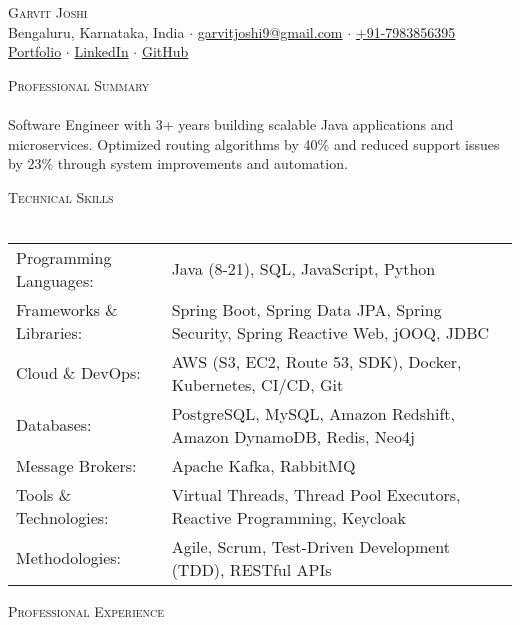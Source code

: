 \documentclass[a4paper]{article}
\newcommand{\lineunder} {
    \vspace*{-8pt} \\
    \hspace*{-18pt} \hrulefill \\
}
\newcommand{\header} [1] {
    {\hspace*{-18pt}\vspace*{6pt} \textsc{#1}}
    \vspace*{-6pt} \lineunder
}
\begin{document}
\vspace*{-30pt}

    

\vspace*{-10pt}
\begin{center}
	{\Huge \scshape {Garvit Joshi}}\\
	Bengaluru, Karnataka, India $\cdot$ \href{mailto:garvitjoshi9@gmail.com}{garvitjoshi9@gmail.com} $\cdot$ \href{tel:+917983856395}{+91-7983856395}\\
	\href{https://garvit-joshi.github.io}{Portfolio} $\cdot$ \href{https://www.linkedin.com/in/garvitjoshi9/}{LinkedIn} $\cdot$ \href{https://github.com/garvit-joshi/}{GitHub}\\
\end{center}

\header{Professional Summary}
Software Engineer with 3+ years building scalable Java applications and microservices. Optimized routing algorithms by 40\% and reduced support issues by 23\% through system improvements and automation.

\header{Technical Skills}
\begin{tabular}{ l l }
	Programming Languages: & Java (8-21), SQL, JavaScript, Python \\
	Frameworks \& Libraries: & Spring Boot, Spring Data JPA, Spring Security, Spring Reactive Web, jOOQ, JDBC \\
	Cloud \& DevOps: & AWS (S3, EC2, Route 53, SDK), Docker, Kubernetes, CI/CD, Git \\
	Databases: & PostgreSQL, MySQL, Amazon Redshift, Amazon DynamoDB, Redis, Neo4j \\
	Message Brokers: & Apache Kafka, RabbitMQ \\
	Tools \& Technologies: & Virtual Threads, Thread Pool Executors, Reactive Programming, Keycloak \\
	Methodologies: & Agile, Scrum, Test-Driven Development (TDD), RESTful APIs \\
\end{tabular}
\vspace{0mm}

\header{Professional Experience}
\vspace{0mm}
\end{document}
